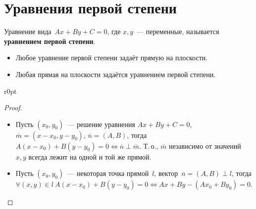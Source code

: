 \section{Уравнения первой степени}
Уравнение вида~$Ax + By + C = 0$, где $x, y$~--- переменные, называется \textbf{уравнением первой степени}.

\begin{theorem}
\begin{itemize}
	\item Любое уравнение первой степени задаёт прямую на плоскости.
	\item Любая прямая на плоскости задаётся уравнением первой степени.
\end{itemize}
\end{theorem}

\begin{wrapfigure}[3]{r}{0pt}\noindent
{}
\end{wrapfigure}

\begin{proof}
\begin{itemize}
	\item Пусть $(x_0, y_0)$~--- решение уравнения $Ax + By + C = 0$, $\overline m = (x - x_0, y - y_0)$, $\overline n = (A, B)$, тогда $A(x - x_0) + B(y - y_0) = 0 \Leftrightarrow \overline n \perp \overline m$.
	Т.\,о., $\overline m$ независимо от значений $x, y$ всегда лежит на одной и той же прямой.
	
	\item Пусть $(x_0, y_0)$~--- некоторая точка прямой~$l$, вектор~$\overline n = (A, B) \perp l$, тогда $\forall (x, y) \in l \ \allowbreak A(x - x_0) + B(y - y_0) = 0 \Leftrightarrow Ax + By - (Ax_0 + By_0) = 0$.
\end{itemize}
\end{proof}

